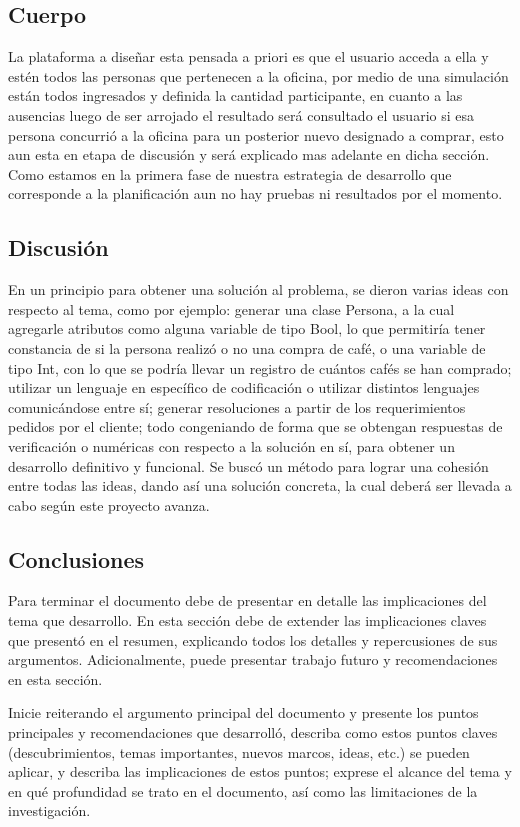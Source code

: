\documentclass[twocolumn,11pts]{IEEEtran}
\begin{document}
\subsection{Cuerpo}

La plataforma a diseñar esta pensada a priori es que el usuario acceda a ella y estén todos las personas que pertenecen a la oficina, por medio de una simulación  están todos ingresados y definida la cantidad participante, en cuanto a las ausencias luego de ser arrojado el resultado será consultado el usuario si esa persona concurrió a la oficina para un posterior nuevo designado a comprar, esto aun esta en etapa de discusión y será explicado mas adelante en dicha sección.
Como estamos en la primera fase de nuestra estrategia de desarrollo que corresponde a la planificación aun no hay pruebas ni resultados por el momento.

\subsection{Discusión}
En un principio para obtener una solución al problema, se dieron varias ideas con respecto al tema, como por ejemplo: generar una clase Persona, a la cual agregarle atributos como alguna variable de tipo Bool, lo que permitiría tener constancia de si la persona realizó o no una compra de café, o una variable de tipo Int, con lo que se podría llevar un registro de cuántos cafés se han comprado; utilizar un lenguaje en específico de codificación o utilizar distintos lenguajes comunicándose entre sí; generar resoluciones a partir de los requerimientos pedidos por el cliente; todo congeniando de forma que se obtengan respuestas de verificación o numéricas con respecto a la solución en sí, para obtener un desarrollo definitivo y funcional. Se buscó un método para lograr una cohesión entre todas las ideas, dando así una solución concreta, la cual deberá ser llevada a cabo según este proyecto avanza.

\subsection{Conclusiones}
Para terminar el documento debe de presentar en detalle las implicaciones del tema que desarrollo. En esta sección debe de extender las implicaciones claves que presentó en el resumen, explicando todos los detalles y repercusiones de sus argumentos. Adicionalmente, puede presentar trabajo futuro y recomendaciones en esta sección.

Inicie reiterando el argumento principal del documento y presente los puntos principales y recomendaciones que desarrolló, describa como estos puntos claves (descubrimientos, temas importantes, nuevos marcos, ideas, etc.) se pueden aplicar, y describa las implicaciones de estos puntos; exprese el alcance del tema y en qué profundidad se trato en el documento, así como las limitaciones de la investigación. 
\end{document}
